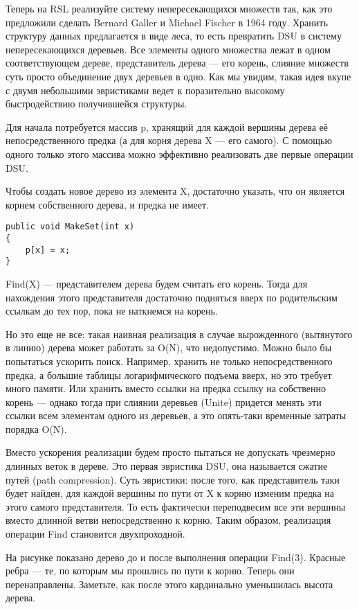 \documentclass[14pt, twoside]{extreport}
\begin{document}
Теперь на RSL реализуйте систему непересекающихся множеств так, как это предложили сделать Bernard Galler и Michael Fischer в 1964 году. Хранить структуру данных предлагается в виде леса, то есть превратить DSU в систему непересекающихся деревьев. Все элементы одного множества лежат в одном соответствующем дереве, представитель дерева — его корень, слияние множеств суть просто объединение двух деревьев в одно. Как мы увидим, такая идея вкупе с двумя небольшими эвристиками ведет к поразительно высокому быстродействию получившейся структуры.

Для начала потребуется массив p, хранящий для каждой вершины дерева её непосредственного предка (а для корня дерева X — его самого). С помощью одного только этого массива можно эффективно реализовать две первые операции DSU.

Чтобы создать новое дерево из элемента X, достаточно указать, что он является корнем собственного дерева, и предка не имеет.

\begin{lstlisting}
public void MakeSet(int x)
{
    p[x] = x;
}
\end{lstlisting}

Find(X) --- представителем дерева будем считать его корень. Тогда для нахождения этого представителя достаточно подняться вверх по родительским ссылкам до тех пор, пока не наткнемся на корень.

Но это еще не все: такая наивная реализация в случае вырожденного (вытянутого в линию) дерева может работать за O(N), что недопустимо. Можно было бы попытаться ускорить поиск. Например, хранить не только непосредственного предка, а большие таблицы логарифмического подъема вверх, но это требует много памяти. Или хранить вместо ссылки на предка ссылку на собственно корень — однако тогда при слиянии деревьев (Unite) придется менять эти ссылки всем элементам одного из деревьев, а это опять-таки временные затраты порядка O(N).

Вместо ускорения реализации будем просто пытаться не допускать чрезмерно длинных веток в дереве. Это первая эвристика DSU, она называется сжатие путей (path compression). Суть эвристики: после того, как представитель таки будет найден, для каждой вершины по пути от X к корню изменим предка на этого самого представителя. То есть фактически переподвесим все эти вершины вместо длинной ветви непосредственно к корню. Таким образом, реализация операции Find становится двухпроходной.

На рисунке показано дерево до и после выполнения операции Find(3). Красные ребра — те, по которым мы прошлись по пути к корню. Теперь они перенаправлены. Заметьте, как после этого кардинально уменьшилась высота дерева.
\end{document}
